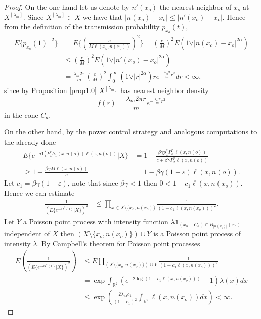 \begin{proof}
On the one hand let us denote by $n'(x_o)$ the nearest neighbor of $x_o$ at $X^{[\lambda_m]}$. Since $X^{[\lambda_m]}\subset X$ we have that $\vert n(x_o)-x_o\vert\leq\vert n'(x_o)-x_o\vert$. Hence from the definition of the transmission probability $p_{x_o}(t)$,
\begin{align}
E\lbrace p_{x_o}(1)^{-2}\rbrace &= E\lbrace(\frac{c}{M\ell( x_o, n(x_o))})^{2}\rbrace=(\frac{c}{M})^{2}E(1\vee\vert n(x_o)-x_o\vert^{2\alpha})\nonumber\\
&\leq (\frac{c}{M})^{2}E(1\vee\vert n'(x_o)-x_o\vert^{2\alpha})\nonumber\\
&= \frac{\lambda_m 2\pi }{m}(\frac{c}{M})^{2}\int_0^\infty(1\vee\vert r\vert^{2\alpha})re^{-\frac{\lambda_m \pi }{m}r^2} dr<\infty,\nonumber
\end{align}
since by Proposition \ref{prop1.0} $X^{[\lambda_m]}$ has nearest neighbor density $$f(r)=\frac{\lambda_m 2\pi r}{m}e^{-\frac{\lambda_m \pi }{m}r^2}$$
in the cone $C_d$. 

 On the other hand, by the power control strategy and analogous computations to the already done
\begin{align}
E\lbrace e^{-a\textbf{1}^{*}_x P_x^{*}h_1(x,n(o))\ell(z,n(o))}\vert X\rbrace&= 1-\frac{\beta\gamma p^{*}_x P^{*}_x\ell(x,n(o))}{c+\beta\gamma P^{*}_z\ell(x,n(o))}\nonumber\\
\geq 1-\frac{\beta\gamma M\ell(x,n(o))}{c}&=1-\beta\gamma(1-\varepsilon)\ell(x,n(o)).\nonumber
\end{align}
Let $c_1=\beta\gamma(1-\varepsilon)$, note that since $\beta\gamma<1$ then $0<1-c_1\ell(x,n(x_o))$. Hence we can estimate
\begin{align}
\frac{1}{(E\lbrace e^{-aI^*(1)}\vert X\rbrace)^2} &\leq\prod_{x\in X\setminus\lbrace x_o,n(x_o)\rbrace}\frac{1}{(1-c_1\ell(x,n(x_o)))^2}.\nonumber
\end{align}
Let $Y$ a Poisson point process with intensity function $\lambda\mathds{1}_{(x_o+C_d)\cap B_{\vert n(x_o)\vert}(x_o)}$ independent of $X$ then $(X\setminus\lbrace x_o, n(x_o)\rbrace)\cup Y$ is a Poisson point process of intensity $\lambda$. By Campbell's theorem for Poisson point processes
\begin{align}
E(\frac{1}{(E\lbrace e^{-aI^*(1)}\vert X\rbrace)^2}) &\leq E\prod_{(X\setminus\lbrace x_o, n(x_o)\rbrace)\cup Y}\frac{1}{(1-c_1\ell(x,n(x_o)))^2}\nonumber\\
&=\exp\int_{\mathbb{R}^2}(e^{-2\log(1-c_1\ell(x,n(x_o)))}-1)\lambda(x)dx\nonumber\\
&\leq \exp(\frac{2\lambda_M c_1}{(1-c_1)^2}\int_{\mathbb{R}^2}\ell(x,n(x_o))dx)<\infty.\nonumber
\end{align}
\end{proof}



